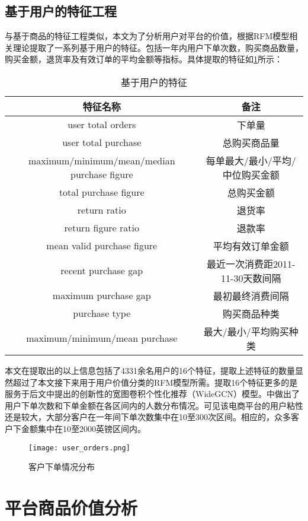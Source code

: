 \documentclass[lang=cn,11pt,a4paper,cite=authoryear]{elegantpaper}
\begin{document}
\subsection{基于用户的特征工程}
与基于商品的特征工程类似，本文为了分析用户对平台的价值，根据RFM模型相关理论提取了一系列基于用户的特征。包括一年内用户下单次数，购买商品数量，购买金额，退货率及有效订单的平均金额等指标。具体提取的特征如\ref{基于用户的特征}所示：
\begin{center}
\begin{longtable}{c|c}
    \caption{基于用户的特征}
    \label{基于用户的特征}\\
    \hline
      \textbf{特征名称} & \textbf{备注} \\
      \hline
      user total orders  & 下单量 \\
      user total purchase  & 总购买商品量 \\
      maximum/minimum/mean/median purchase figure & 每单最大/最小/平均/中位购买金额  \\
      total purchase figure   & 总购买金额 \\
      return ratio & 退货率 \\
      return figure ratio & 退款率 \\
      mean valid purchase figure & 平均有效订单金额 \\
      recent purchase gap & 最近一次消费距2011-11-30天数间隔 \\
      maximum purchase gap & 最初最终消费间隔 \\
      purchase type & 购买商品种类 \\
      maximum/minimum/mean purchase  & 最大/最小/平均购买种类 \\
      \hline
  \end{longtable}
\end{center}

本文在提取出的以上信息包括了4331余名用户的16个特征，提取上述特征的数量显然超过了本文接下来用于用户价值分类的RFM模型所需。提取16个特征更多的是服务于后文中提出的创新性的宽图卷积个性化推荐（WideGCN）模型。中做出了用户下单次数和下单金额在各区间内的人数分布情况。可见该电商平台的用户粘性还是较大，大部分客户在一年间下单次数集中在10至300次区间。相应的，众多客户下金额集中在10至2000英镑区间内。
\begin{figure}[H]
  \centering
  \texttt{[image: user\_orders.png]}
  \caption{客户下单情况分布}
  \label{客户下单情况分布}
\end{figure}

\section{平台商品价值分析}
\end{document}
